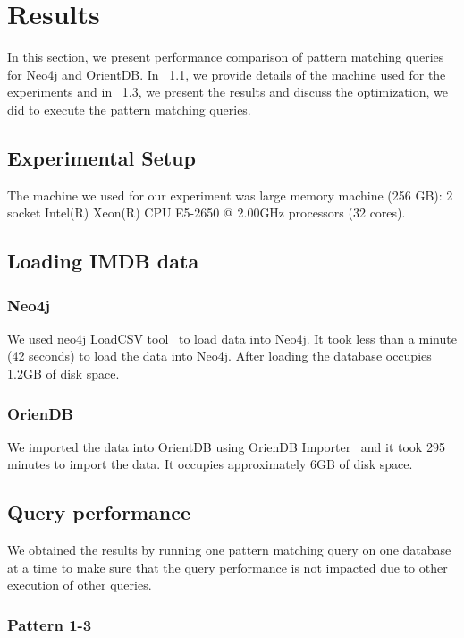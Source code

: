 
\section{Results}
In this section, we present  performance comparison of pattern matching queries for Neo4j and OrientDB. In ~\ref{setup}, we provide details of the machine used for the experiments and in ~\ref{result}, we present the results and discuss the optimization, we did to execute the pattern matching queries.

\subsection{Experimental Setup}
\label{setup}

The machine we used for our experiment was large memory machine (256 GB): 2 socket Intel(R) Xeon(R) CPU E5-2650 @ 2.00GHz processors (32 cores).

\subsection{Loading IMDB data}
\subsubsection{ Neo4j}
We used neo4j LoadCSV tool~\cite{CSVImpor74:online} to load data into Neo4j. It took less than a minute (42 seconds) to load the data into Neo4j. After loading the database occupies 1.2GB of disk space.

\subsubsection{OrienDB}
We imported the data into OrientDB using OrienDB Importer~\cite{orientdb_importer} and it took 295 minutes to import the data. It occupies approximately 6GB of disk space.

\subsection{Query performance}
\label{result}
We obtained the results by running one pattern matching query on one database at a time to make sure that the query performance is not impacted due to other execution of other queries.

\subsubsection{Pattern 1-3}

